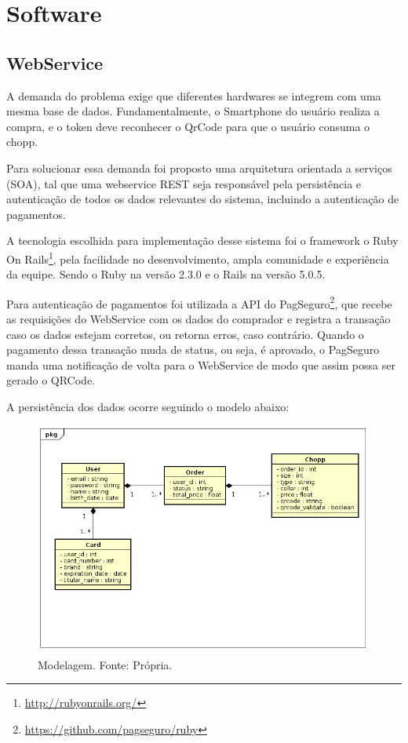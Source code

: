 \chapter[Software]{Software}
    

    \section[WebService]{WebService}

        A demanda do problema exige que diferentes hardwares se integrem com uma
        mesma base de dados. Fundamentalmente, o Smartphone do usuário realiza a compra, e
        o token deve reconhecer o QrCode para que o usuário consuma o chopp.
        
        Para solucionar essa demanda foi proposto uma arquitetura orientada a serviços
        (SOA), tal que uma webservice REST seja responsável pela persistência e autenticação de todos os
        dados relevantes do sistema, incluindo a autenticação de pagamentos.

        A tecnologia escolhida para implementação desse sistema foi o framework o 
        Ruby On Rails\footnote{\url{http://rubyonrails.org/}}, pela facilidade no desenvolvimento, 
        ampla comunidade e experiência da equipe. Sendo o Ruby na versão 2.3.0 e o Rails na versão 5.0.5.

        Para autenticação de pagamentos foi utilizada a API do PagSeguro\footnote{\url{https://github.com/pagseguro/ruby}},
        que recebe as requisições do WebService com os dados do comprador e registra a transação caso os dados estejam corretos,
        ou retorna erros, caso contrário. Quando o pagamento dessa transação muda de status, ou seja, é aprovado, o PagSeguro
        manda uma notificação de volta para o WebService de modo que assim possa ser gerado o QRCode.

        A persistência dos dados ocorre seguindo o modelo abaixo:

        \begin{figure}[H]
            \centering
            \includegraphics[scale= 0.4]{figuras/Diagrama-de-classes.png}
            \caption{Modelagem. Fonte: Própria.}
            \label{modelagem}
        \end{figure}

